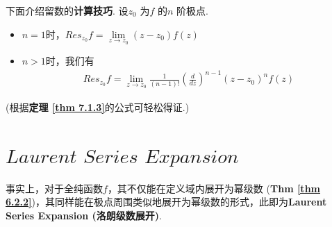	\vspace{2em}
	下面介绍留数的\textbf{计算技巧}. 设$z_0$ 为$f$ 的$n$ 阶极点.
	\begin{itemize}
		\item $n = 1$时，$Res_{z_0}f = \underset{z \to z_0}{\lim}{(z - z_0) f(z)}$
		
		\item $n > 1$时，我们有
		\begin{align}
			Res_{z_0}f = \lim_{z \to z_0}{\frac{1}{(n - 1)!} \left( \frac{d}{dz} \right)^{n - 1} (z - z_0)^n f(z)}
		\end{align}
	\end{itemize}
	\begin{center}
		(根据\textbf{定理 \ref{thm 7.1.3}}的公式可轻松得证.)
	\end{center}
	
\newpage
\section{$Laurent \,\, Series \,\, Expansion$}
	事实上，对于全纯函数$f$，其不仅能在定义域内展开为幂级数 (\textbf{Thm \ref{thm 6.2.2}})，其同样能在极点周围类似地展开为幂级数的形式，此即为\textbf{Laurent Series Expansion (洛朗级数展开)}.
	
